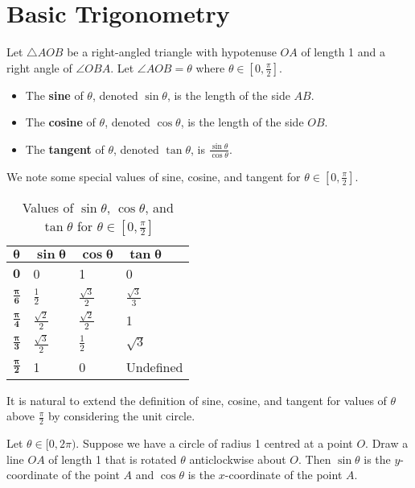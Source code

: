 \section{Basic Trigonometry}
\begin{definition}
    Let $\triangle AOB$ be a right-angled triangle with hypotenuse $OA$ of length 1 and a right angle of $\angle OBA$. Let $\angle AOB = \theta$ where $\theta \in [0, \frac\pi2]$.
    \begin{itemize}
        \item The \textbf{sine} of $\theta$, denoted $\sin\theta$, is the length of the side $AB$.
        \item The \textbf{cosine} of $\theta$, denoted $\cos\theta$, is the length of the side $OB$.
        \item The \textbf{tangent} of $\theta$, denoted $\tan\theta$, is $\frac{\sin\theta}{\cos\theta}$.
    \end{itemize}
\end{definition}

We note some special values of sine, cosine, and tangent for $\theta \in [0, \frac\pi2]$.

\begin{table}[H]
    \centering
    \begin{tabular}{|l|l|l|l|}
        \hline
        $\boldsymbol{\theta}$ & $\boldsymbol{\sin\theta}$ & $\boldsymbol{\cos\theta}$ & $\boldsymbol{\tan\theta}$ \\ \hline
        $\boldsymbol{0}$ & 0 & 1 & 0 \\ \hline
        $\boldsymbol{\frac\pi6}$ & $\frac12$ & $\frac{\sqrt3}2$ & $\frac{\sqrt3}3$ \\ \hline
        $\boldsymbol{\frac\pi4}$ & $\frac{\sqrt2}2$ & $\frac{\sqrt2}2$ & 1 \\ \hline
        $\boldsymbol{\frac\pi3}$ & $\frac{\sqrt3}2$ & $\frac12$ & $\sqrt3$ \\ \hline
        $\boldsymbol{\frac\pi2}$ & 1 & 0 & Undefined \\ \hline
    \end{tabular}
    \caption{Values of $\sin\theta$, $\cos\theta$, and $\tan\theta$ for $\theta \in [0, \frac\pi2]$}
\end{table}

It is natural to extend the definition of sine, cosine, and tangent for values of $\theta$ above $\frac\pi2$ by considering the unit circle.

\begin{definition}
    Let $\theta \in [0, 2\pi)$. Suppose we have a circle of radius 1 centred at a point $O$. Draw a line $OA$ of length 1 that is rotated $\theta$ anticlockwise about $O$. Then $\sin\theta$ is the $y$-coordinate of the point $A$ and  $\cos\theta$ is the $x$-coordinate of the point $A$.
\end{definition}

